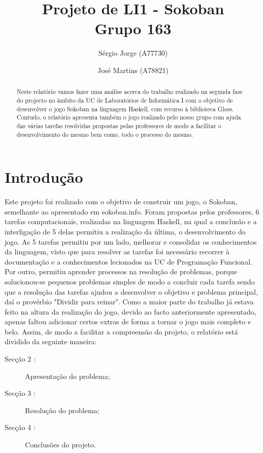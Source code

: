 \documentclass[a4paper]{article}
\title{Projeto de LI1 - Sokoban\\Grupo 163}
\author{Sérgio Jorge (A77730) \and José Martins (A78821)}
\begin{document}
\maketitle

\begin{abstract}
Neste relatório vamos fazer uma análise acerca do trabalho realizado na segunda fase do projecto no âmbito da UC de Laboratórios de Informática I com o objetivo de desenvolver o jogo Sokoban na linguagem Haskell, com recurso à biblioteca Gloss. Contudo, o relatório apresenta também o jogo realizado pelo nosso grupo com ajuda das várias tarefas resolvidas propostas pelas professores de modo a facilitar o desenvolvimento do mesmo bem como, todo o processo do mesmo.
\end{abstract}

\tableofcontents

\section{Introdução}
\label{sec:intro}

Este projeto foi realizado com o objetivo de construir um jogo, o Sokoban, semelhante ao apresentado em sokoban.info. Foram propostas pelos professores, 6 tarefas computacionais, realizadas na linguagem Haskell, na qual a conclusão e a interligação de 5 delas permitiu a realização da última, o desenvolvimento do jogo. As 5 tarefas permitiu por um lado, melhorar e consolidar os conhecimentos da linguagem, visto que para resolver as tarefas foi necessário recorrer à documentação e a conhecimentos lecionados na UC de Programação Funcional. Por outro, permitiu aprender processos na resolução de problemas, porque solucionou-se pequenos problemas simples de modo a concluir cada tarefa sendo que a resolução das tarefas ajudou a desenvolver o objetivo e problema principal, daí o provérbio "Dividir para reinar". Como a maior parte do trabalho já estava feito na altura da realização do jogo, devido ao facto anteriormente apresentado, apenas faltou adicionar certos extras de forma a tornar o jogo mais completo e belo. Assim, de modo a facilitar a compreensão do projeto, o relatório está dividido da seguinte maneira:
\begin{description}
    \item[Secção 2 :] Apresentação do problema;
    \item[Secção 3 :] Resolução do problema;
    \item[Secção 4 :] Conclusões do projeto.
\end{description}
\end{document}
